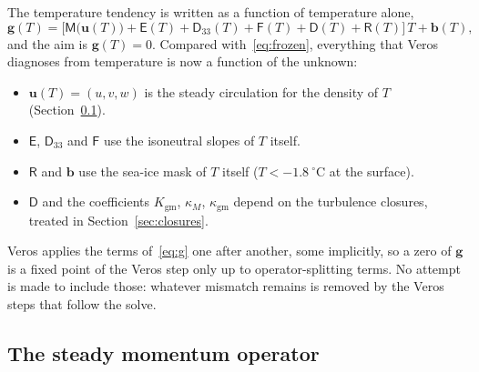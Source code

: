 \documentclass{article}
\begin{document}
The temperature tendency is written as a function of temperature alone,
\begin{equation}
\mathbf{g}(T) = \Big[ \mathsf{M}\big(\mathbf{u}(T)\big) + \mathsf{E}(T) + \mathsf{D}_{33}(T) + \mathsf{F}(T) + \mathsf{D}(T) + \mathsf{R}(T) \Big]\, T + \mathbf{b}(T),
\label{eq:g}
\end{equation}
and the aim is $\mathbf{g}(T)=0$. Compared with~\eqref{eq:frozen}, everything that Veros diagnoses from temperature is now a function of the unknown:
\begin{itemize}
\item $\mathbf{u}(T) = (u,v,w)$ is the steady circulation for the density of $T$ (Section~\ref{sec:momentum_op}).
\item $\mathsf{E}$, $\mathsf{D}_{33}$ and $\mathsf{F}$ use the isoneutral slopes of $T$ itself.
\item $\mathsf{R}$ and $\mathbf{b}$ use the sea-ice mask of $T$ itself ($T<-1.8~^\circ$C at the surface).
\item $\mathsf{D}$ and the coefficients $K_\text{gm}$, $\kappa_M$, $\kappa_\text{gm}$ depend on the turbulence closures, treated in Section~\ref{sec:closures}.
\end{itemize}
Veros applies the terms of~\eqref{eq:g} one after another, some implicitly, so a zero of $\mathbf{g}$ is a fixed point of the Veros step only up to operator-splitting terms. No attempt is made to include those: whatever mismatch remains is removed by the Veros steps that follow the solve.

\subsection{The steady momentum operator}\label{sec:momentum_op}
\end{document}
